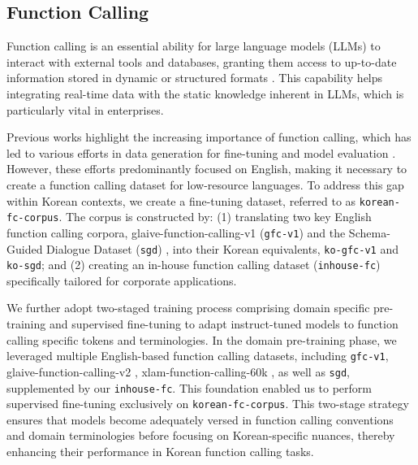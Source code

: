 \subsection{Function Calling}
Function calling is an essential ability for large language models (LLMs) to interact with external tools and databases, granting them access to up-to-date information stored in dynamic or structured formats \citep{schick2023toolformer}.
This capability helps 
integrating real-time data with the static knowledge inherent in LLMs, which is particularly vital in enterprises.

Previous works highlight the increasing importance of function calling, which has led to various efforts in data generation for fine-tuning and model evaluation \citep{basu2024api, guo2024api, qin2023toolllm, tang2023toolalpaca, li2023api, rastogi2020towards, liu2024apigen}.
However, these efforts predominantly focused on English, making it necessary to create a function calling dataset for low-resource languages.
To address this gap within Korean contexts, we create a fine-tuning dataset, referred to as \texttt{korean-fc-corpus}.
The corpus is constructed by: (1) translating two key English function calling corpora, glaive-function-calling-v1 (\texttt{gfc-v1}) \citep{glaiveai2023fcv1} and the Schema-Guided Dialogue Dataset (\texttt{sgd}) \citep{rastogi2020towards}, into their Korean equivalents, \texttt{ko-gfc-v1} and \texttt{ko-sgd}; and (2) creating an in-house function calling dataset (\texttt{inhouse-fc}) specifically tailored for corporate applications.

We further adopt two-staged training process comprising domain specific pre-training and supervised fine-tuning to adapt instruct-tuned models to function calling specific tokens and terminologies.
In the domain pre-training phase, we leveraged multiple English-based function calling datasets, including \texttt{gfc-v1}, glaive-function-calling-v2 \citep{glaiveai2024fcv2}, xlam-function-calling-60k \citep{liu2024apigen}, as well as \texttt{sgd}, supplemented by our \texttt{inhouse-fc}.
This foundation enabled us to perform supervised fine-tuning exclusively on \texttt{korean-fc-corpus}.
This two-stage strategy ensures that models become adequately versed in function calling conventions and domain terminologies before focusing on Korean-specific nuances, thereby enhancing their performance in Korean function calling tasks.

